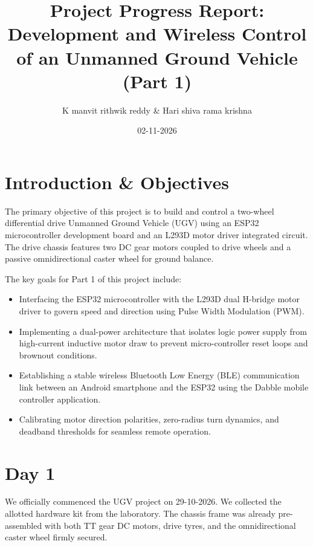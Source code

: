 \documentclass[11pt,a4paper]{article}
\title{\textbf{Project Progress Report: Development and Wireless Control of an Unmanned Ground Vehicle (Part 1)}}
\author{K manvit rithwik reddy \& Hari shiva rama krishna}
\date{02-11-2026}
\begin{document}
\maketitle

\section{Introduction \& Objectives}
The primary objective of this project is to build and control a two-wheel differential drive Unmanned Ground Vehicle (UGV) using an ESP32 microcontroller development board and an L293D motor driver integrated circuit. The drive chassis features two DC gear motors coupled to drive wheels and a passive omnidirectional caster wheel for ground balance.

The key goals for Part 1 of this project include:
\begin{itemize}
    \item Interfacing the ESP32 microcontroller with the L293D dual H-bridge motor driver to govern speed and direction using Pulse Width Modulation (PWM).
    \item Implementing a dual-power architecture that isolates logic power supply from high-current inductive motor draw to prevent micro-controller reset loops and brownout conditions.
    \item Establishing a stable wireless Bluetooth Low Energy (BLE) communication link between an Android smartphone and the ESP32 using the Dabble mobile controller application.
    \item Calibrating motor direction polarities, zero-radius turn dynamics, and deadband thresholds for seamless remote operation.
\end{itemize}

\section{Day 1}
We officially commenced the UGV project on 29-10-2026. We collected the allotted hardware kit from the laboratory. The chassis frame was already pre-assembled with both TT gear DC motors, drive tyres, and the omnidirectional caster wheel firmly secured. 
\end{document}
